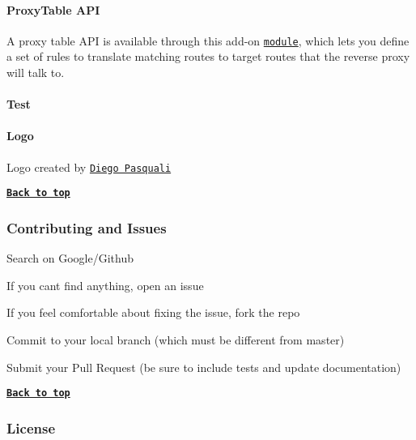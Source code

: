 \paragraph*{Proxy\+Table A\+PI}

A proxy table A\+PI is available through this add-\/on \href{https://github.com/donasaur/http-proxy-rules}{\tt module}, which lets you define a set of rules to translate matching routes to target routes that the reverse proxy will talk to.

\paragraph*{Test}




\paragraph*{Logo}

Logo created by \href{http://dribbble.com/diegopq}{\tt Diego Pasquali}

{\bfseries \href{#table-of-contents}{\tt Back to top}}

\subsubsection*{Contributing and Issues}


\begin{DoxyItemize}
\item Search on Google/\+Github
\item If you can\textquotesingle{}t find anything, open an issue
\item If you feel comfortable about fixing the issue, fork the repo
\item Commit to your local branch (which must be different from {\ttfamily master})
\item Submit your Pull Request (be sure to include tests and update documentation)
\end{DoxyItemize}

{\bfseries \href{#table-of-contents}{\tt Back to top}}

\subsubsection*{License}

